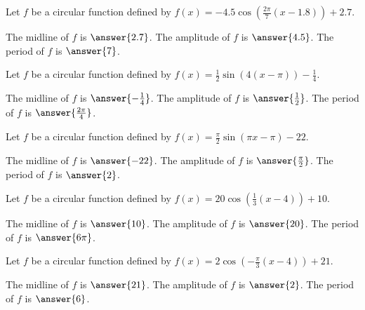 \documentclass{ximera}
\author{Kenneth Berglund}
\begin{document}
\begin{exercise}
Let $f$ be a circular function defined by $f(x) = -4.5 \cos\left(\frac{2\pi}{7}(x - 1.8)\right) + 2.7$.

The midline of $f$ is $\answer{2.7}$. The amplitude of $f$ is $\answer{4.5}$. The period of $f$ is $\answer{7}$. 
\end{exercise} 

\begin{exercise}
Let $f$ be a circular function defined by $f(x) = \frac{1}{2}\sin\left(4(x - \pi)\right) - \frac{1}{4}$.

The midline of $f$ is $\answer{-\frac{1}{4}}$. The amplitude of $f$ is $\answer{\frac{1}{2}}$. The period of $f$ is $\answer{\frac{2\pi}{4}}$. 
\end{exercise} 

\begin{exercise}
Let $f$ be a circular function defined by $f(x) = \frac{\pi}{2}\sin\left(\pi x - \pi\right) - 22$.

The midline of $f$ is $\answer{-22}$. The amplitude of $f$ is $\answer{\frac{\pi}{2}}$. The period of $f$ is $\answer{2}$. 
\end{exercise} 

\begin{exercise}
Let $f$ be a circular function defined by $f(x) = 20\cos\left(\frac{1}{3}( x - 4)\right) + 10$.

The midline of $f$ is $\answer{10}$. The amplitude of $f$ is $\answer{20}$. The period of $f$ is $\answer{6\pi}$. 
\end{exercise} 

\begin{exercise}
Let $f$ be a circular function defined by $f(x) = 2\cos\left(-\frac{\pi}{3}( x - 4)\right) + 21$.

The midline of $f$ is $\answer{21}$. The amplitude of $f$ is $\answer{2}$. The period of $f$ is $\answer{6}$. 
\end{exercise} 
\end{document}
